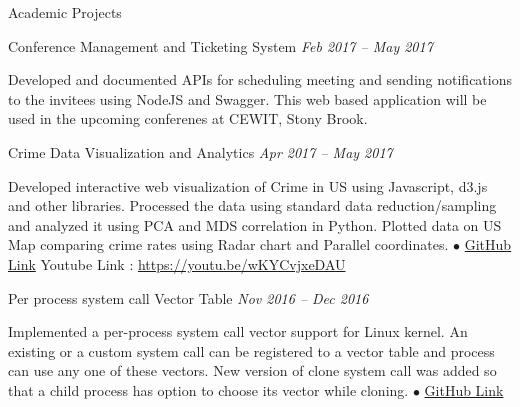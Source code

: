 \documentclass{resume} %
\begin{document}
\begin{rSection}{Academic Projects}


\begin{rSubsection}{Conference Management and Ticketing System} {\emph {Feb 2017 -- May 2017}}{}{}
	\item Developed and documented APIs for scheduling meeting and sending notifications to the invitees using NodeJS and Swagger. This web based application will be used in the upcoming conferenes at CEWIT, Stony Brook.
\end{rSubsection}



\begin{rSubsection}{Crime Data Visualization and Analytics} {\emph {Apr 2017 -- May 2017}}{}{}
\item Developed interactive web visualization of Crime in US using Javascript, d3.js and other libraries. Processed the data using standard data reduction/sampling and analyzed it using PCA and MDS correlation in Python. Plotted data on US Map comparing crime rates using Radar chart and Parallel coordinates.
{\tiny$\bullet$}
\href{https://github.com/t-lohani/Crime-data-visualization-and-analytics}{GitHub Link}
Youtube Link : \href{https://youtu.be/wKYCvjxeDAU}{https://youtu.be/wKYCvjxeDAU}
\end{rSubsection}


\begin{rSubsection}{Per process system call Vector Table} {\emph {Nov 2016 -- Dec 2016}}{}{}
\item Implemented a per-process system call vector support for Linux kernel. An existing or a custom system call can be registered to a vector table and process can use any one of these vectors. New version of clone system call was added so that a child process has option to choose its vector while cloning.
{\tiny$\bullet$}
\href{https://github.com/t-lohani/Per-process-system-call}{GitHub Link}
\newline
\newline\newline\newline
\end{rSubsection}


\end{rSection}
\end{document}
